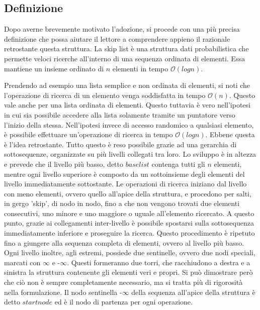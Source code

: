 	\subsection{Definizione}
	
%		

	Dopo averne brevemente motivato l'adozione, si procede con una più precisa definizione che possa aiutare il lettore a comprendere appieno il razionale retrostante questa struttura. 
	La skip list è una struttura dati probabilistica che permette veloci ricerche all'interno di una sequenza ordinata di elementi. Essa mantiene un insieme ordinato di $ n $ elementi in tempo $\mathcal{O}(log{}n)$.
	
	Prendendo ad esempio una lista semplice e non ordinata di elementi, si noti che l'operazione di ricerca di un elemento venga soddisfatta in tempo $\mathcal{O}(n)$. Questo vale anche per una lista ordinata di elementi. Questo tuttavia è vero nell'ipotesi in cui sia possibile accedere alla lista solamente tramite un puntatore verso l'inizio della stessa. Nell'ipotesi invece di accesso randomico a qualsiasi elemento, è possibile effettuare un'operazione di ricerca in tempo $\mathcal{O}(log{}n)$. Ebbene questa è l'idea retrostante.
	Tutto questo è reso possibile grazie ad una gerarchia di sottosequenze, organizzate su più livelli collegati tra loro. Lo sviluppo è in altezza e prevede che il livello più basso, detto $base list$ contenga tutti gli $ n $ elementi, mentre ogni livello superiore è composto da un sottoinsieme degli elementi del livello immediatamente sottostante. Le operazioni di ricerca iniziano dal livello con meno elementi, ovvero quello all'apice della struttura, e procedono per salti, in gergo 'skip', di nodo in nodo, fino a che non vengono trovati due elementi consecutivi, uno minore e uno maggiore o uguale all'elemento ricercato. A questo punto, grazie ai collegamenti inter-livello è possibile spostarsi sulla sottosequenza immediatamente inferiore e proseguire la ricerca. Questo procedimento è ripetuto fino a giungere alla sequenza completa di elementi, ovvero al livello più basso.
	Ogni livello inoltre, agli estremi, possiede due sentinelle, ovvero due nodi speciali, marcati con $\infty$ e -$\infty$. Questi formeranno due torri, che racchiudono a destra e a sinistra la struttura contenente gli elementi veri e propri. Si può dimostrare però che ciò non è sempre completamente necessario, ma si tratta più di rigorosità nella formulazione.
	Il nodo sentinella -$\infty$ della sequenza all'apice della struttura è detto $start node$ ed è il nodo di partenza per ogni operazione.
	
